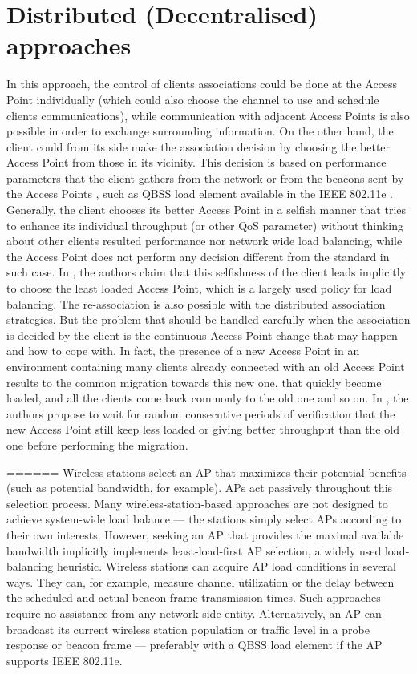 \documentclass[journal,transmag]{IEEEtran}
\begin{document}
\section{Distributed (Decentralised) approaches} 
In this approach, the control of clients associations could be done at the Access Point individually (which could also choose the channel to use and schedule clients communications), while communication with adjacent Access Points is also possible in order to exchange surrounding information. On the other hand, the client could from its side make the association decision by choosing the better Access Point from those in its vicinity. This decision is based on performance parameters that the client gathers from the network or from the beacons sent by the Access Points \cite{17QOS_AP_selection}, such as QBSS load element available in the IEEE 802.11e  \cite{09load_balancing_WLAN}. Generally, the client chooses its better Access Point in a selfish manner that tries to enhance its individual throughput (or other QoS parameter)  without thinking about other clients resulted performance nor network wide load balancing, while the Access Point does not perform any decision different from the standard in such case. In \cite{09load_balancing_WLAN}, the authors claim that this selfishness of the client leads implicitly to choose the least loaded Access Point, which is a largely used policy for load balancing.   
The re-association is also possible with the distributed association strategies. But the problem that should be handled carefully when the association is decided by the client is the continuous Access Point change that may happen and how to cope with. In fact, the presence of a new Access Point in an environment containing many clients already connected with an old Access Point results to the common migration towards this new one, that quickly become loaded, and all the clients come back commonly to the old one and so on. In \cite{09load_balancing_WLAN}, the authors propose to wait for random consecutive periods of verification that the new Access Point still keep less loaded or giving better throughput than the old one before performing the migration. 





======
Wireless stations select an AP that maximizes their potential benefits (such as potential bandwidth, for example). APs act passively throughout this selection process. Many wireless-station-based approaches are not designed to achieve system-wide load balance — the stations simply select APs according to their own interests. However, seeking an AP that provides the maximal available bandwidth implicitly implements least-load-first AP selection, a widely used load-balancing heuristic. Wireless stations can acquire AP load conditions in several ways. They can, for example, measure channel utilization or the delay between the scheduled and actual beacon-frame transmission times. Such approaches require no assistance from any network-side entity. Alternatively, an AP can broadcast its current wireless station population or traffic level in a probe response or beacon frame — preferably with a QBSS load element if the AP supports IEEE 802.11e.\cite{09load_balancing_WLAN} \\
\end{document}
